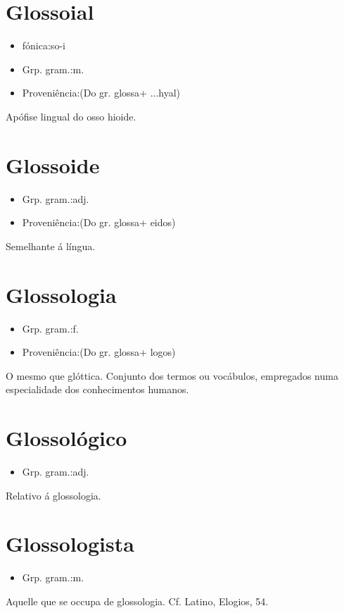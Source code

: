 \section{Glossoial}
\begin{itemize}
\item {fónica:so-i}
\end{itemize}
\begin{itemize}
\item {Grp. gram.:m.}
\end{itemize}
\begin{itemize}
\item {Proveniência:(Do gr. \textunderscore glossa\textunderscore  + \textunderscore ...hyal\textunderscore )}
\end{itemize}
Apófise lingual do osso hioide.
\section{Glossoide}
\begin{itemize}
\item {Grp. gram.:adj.}
\end{itemize}
\begin{itemize}
\item {Proveniência:(Do gr. \textunderscore glossa\textunderscore  + \textunderscore eidos\textunderscore )}
\end{itemize}
Semelhante á língua.
\section{Glossologia}
\begin{itemize}
\item {Grp. gram.:f.}
\end{itemize}
\begin{itemize}
\item {Proveniência:(Do gr. \textunderscore glossa\textunderscore  + \textunderscore logos\textunderscore )}
\end{itemize}
O mesmo que \textunderscore glóttica\textunderscore .
Conjunto dos termos ou vocábulos, empregados numa especialidade dos conhecimentos humanos.
\section{Glossológico}
\begin{itemize}
\item {Grp. gram.:adj.}
\end{itemize}
Relativo á glossologia.
\section{Glossologista}
\begin{itemize}
\item {Grp. gram.:m.}
\end{itemize}
Aquelle que se occupa de glossologia. Cf. Latino, \textunderscore Elogios\textunderscore , 54.
